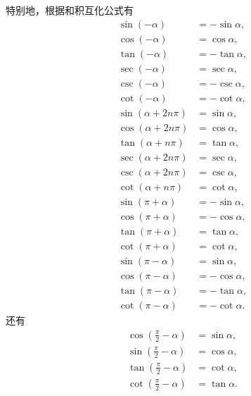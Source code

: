 特别地，根据和积互化公式有\begin{align}
	\sin(-\alpha)
	&= -\sin\alpha, \\
	\cos(-\alpha)
	&= \cos\alpha, \\
	\tan(-\alpha)
	&= -\tan\alpha, \\
	\sec(-\alpha)
	&= \sec\alpha, \\
	\csc(-\alpha)
	&= -\csc\alpha, \\
	\cot(-\alpha)
	&= -\cot\alpha, \\
	\sin(\alpha+2n\pi)
	&= \sin\alpha, \\
	\cos(\alpha+2n\pi)
	&= \cos\alpha, \\
	\tan(\alpha+n\pi)
	&= \tan\alpha, \\
	\sec(\alpha+2n\pi)
	&= \sec\alpha, \\
	\csc(\alpha+2n\pi)
	&= \csc\alpha, \\
	\cot(\alpha+n\pi)
	&= \cot\alpha, \\
	\sin(\pi+\alpha)
	&= -\sin\alpha,
		\label{equation:函数.三角函数.诱导公式1} \\
	\cos(\pi+\alpha)
	&= -\cos\alpha,
		\label{equation:函数.三角函数.诱导公式2} \\
	\tan(\pi+\alpha)
	&= \tan\alpha,
		\label{equation:函数.三角函数.诱导公式3} \\
	\cot(\pi+\alpha)
	&= \cot\alpha,
		\label{equation:函数.三角函数.诱导公式4} \\
	\sin(\pi-\alpha)
	&= \sin\alpha,
		\label{equation:函数.三角函数.诱导公式5} \\
	\cos(\pi-\alpha)
	&= -\cos\alpha,
		\label{equation:函数.三角函数.诱导公式6} \\
	\tan(\pi-\alpha)
	&= -\tan\alpha,
		\label{equation:函数.三角函数.诱导公式7} \\
	\cot(\pi-\alpha)
	&= -\cot\alpha.
		\label{equation:函数.三角函数.诱导公式8}
\end{align}
还有\begin{align}
	\cos\left(\frac{\pi}{2}-\alpha\right)
	&= \sin\alpha,
		\label{equation:函数.三角函数.诱导公式9} \\
	\sin\left(\frac{\pi}{2}-\alpha\right)
	&= \cos\alpha,
		\label{equation:函数.三角函数.诱导公式10} \\
	\tan\left(\frac{\pi}{2}-\alpha\right)
	&= \cot\alpha,
		\label{equation:函数.三角函数.诱导公式11} \\
	\cot\left(\frac{\pi}{2}-\alpha\right)
	&= \tan\alpha.
		\label{equation:函数.三角函数.诱导公式12}
\end{align}
